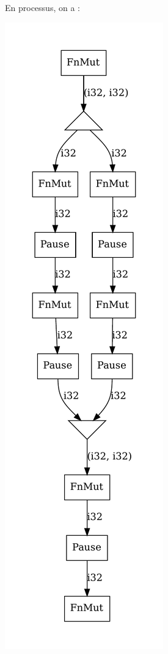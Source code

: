 \documentclass[a4paper]{article}
\renewcommand{\(}{\left(}
\renewcommand{\)}{\right)}
\begin{document}
\pagebreak
En processus, on a :
\begin{center}
\includegraphics[scale=0.72]{parp.pdf}
\end{center}
\end{document}
